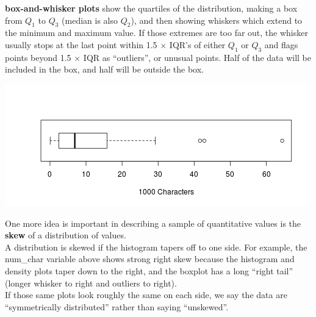 \begin{list}{}{}
\begin{list}{}{}
   \item [\bf box-and-whisker plots] show the quartiles of the
     distribution, making a box from $Q_1$ to $Q_3$ (median is also $Q_2$), and
     then showing whiskers which extend to the minimum and maximum
     value. If those extremes are too far out, the whisker usually
     stops at the last point within 1.5 $\times$ IQR's of either
     $Q_1$ or $Q_3$ and flags points beyond 1.5 $\times$ IQR as
     ``outliers'', or unusual points.  
     Half of the data will be included in the box, and half will be
     outside the box. \vspace{-1cm}
  \begin{center}
  \includegraphics[width = .8\linewidth]{plots/boxplotDemo1.png} \vspace{-.5cm}
  \end{center}

\end{list}
\end{list}



One more idea is important in describing a sample of quantitative
values is the {\bf skew} of a distribution of values.  \\
  A distribution is skewed if the histogram tapers off to one
  side. For example, the num\_char variable above shows strong right
  skew because the histogram and density plots taper down to the
  right, and the boxplot has a long ``right tail'' (longer whisker to
  right and outliers to right).
\\
 If those same plots look roughly the same on each side, we say the
 data  are ``symmetrically distributed'' rather than saying ``unskewed''.

